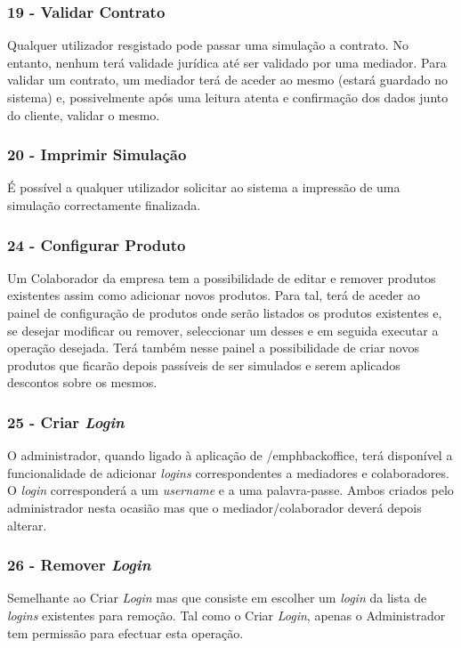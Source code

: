 \subsubsection{\textbf{19 - Validar Contrato}}
Qualquer utilizador resgistado pode passar uma simulação a contrato. No entanto, nenhum terá validade jurídica até ser validado por uma mediador. Para validar um contrato, um mediador terá de aceder ao mesmo (estará guardado no sistema) e, possivelmente após uma leitura atenta e confirmação dos dados junto do cliente, validar o mesmo.

\subsubsection{\textbf{20 - Imprimir Simulação}}
É possível a qualquer utilizador solicitar ao sistema a impressão de uma simulação correctamente finalizada.

\subsubsection{\textbf{24 - Configurar Produto}}
Um Colaborador da empresa tem a possibilidade de editar e remover produtos existentes assim como adicionar novos produtos. Para tal, terá de aceder ao painel de configuração de produtos onde serão listados os produtos existentes e, se desejar modificar ou remover, seleccionar um desses e em seguida executar a operação desejada. Terá também nesse painel a possibilidade de criar novos produtos que ficarão depois passíveis de ser simulados e serem aplicados descontos sobre os mesmos.

\subsubsection{\textbf{25 - Criar \emph{Login}}}
O administrador, quando ligado à aplicação de /emph{backoffice}, terá disponível a funcionalidade de adicionar \emph{logins} correspondentes a mediadores e colaboradores. O \emph{login} corresponderá a um \emph{username} e a uma palavra-passe. Ambos criados pelo administrador nesta ocasião mas que o mediador/colaborador deverá depois alterar.

\subsubsection{\textbf{26 - Remover \emph{Login}}}
Semelhante ao Criar \emph{Login} mas que consiste em escolher um \emph{login} da lista de \emph{logins} existentes para remoção. Tal como o Criar \emph{Login}, apenas o Administrador tem permissão para efectuar esta operação.